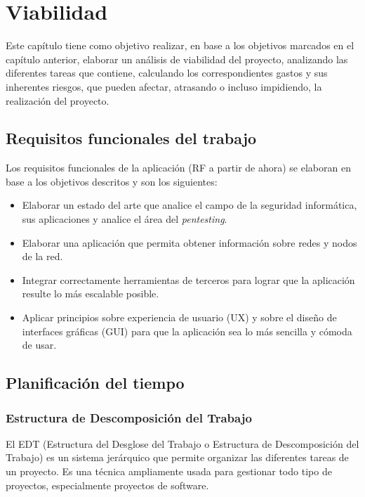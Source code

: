 \chapter{Viabilidad}
Este capítulo tiene como objetivo realizar, en base a los objetivos marcados en el capítulo anterior, elaborar un análisis de viabilidad del proyecto, analizando las diferentes tareas que contiene, calculando los correspondientes gastos y sus inherentes riesgos, que pueden afectar, atrasando o incluso impidiendo, la realización del proyecto.

\section{Requisitos funcionales del trabajo}
Los requisitos funcionales de la aplicación (RF a partir de ahora) se elaboran en base a los objetivos descritos y son los siguientes:

\begin{itemize}
	\item Elaborar un estado del arte que analice el campo de la seguridad informática, sus aplicaciones y analice el área del \textit{pentesting}.
	\item Elaborar una aplicación que permita obtener información sobre redes y nodos de la red.
	\item Integrar correctamente herramientas de terceros para lograr que la aplicación resulte lo más escalable posible.
	\item Aplicar principios sobre experiencia de usuario (UX) y sobre el diseño de interfaces gráficas (GUI) para que la aplicación sea lo más sencilla y cómoda de usar.
\end{itemize}




\section{Planificación del tiempo}

\subsection[EDT]{Estructura de Descomposición del Trabajo}
El EDT (Estructura del Desglose del Trabajo o Estructura de Descomposición del Trabajo) es un sistema jerárquico que permite organizar las diferentes tareas de un proyecto. Es una técnica ampliamente usada para gestionar todo tipo de proyectos, especialmente proyectos de software.

